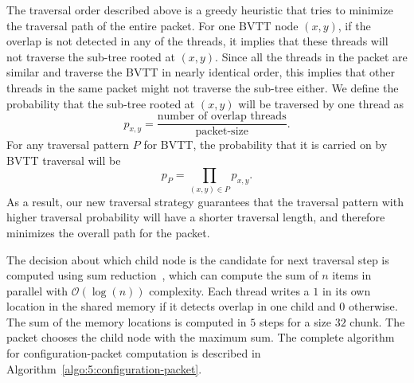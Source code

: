 The traversal order described above is a greedy heuristic that tries to minimize the traversal path of the entire packet. For one BVTT node $(x,y)$, if the overlap is not detected in any of the threads, it implies that these threads will not traverse the
sub-tree rooted at $(x,y)$. Since all the threads in the packet are similar and traverse the BVTT in nearly identical order,
this implies that other threads in the same packet might not traverse the sub-tree either. We define the probability that the sub-tree rooted at $(x,y)$ will be traversed by one thread as $$p_{x,y} = \frac{\text{number of overlap\ threads}}{\text{packet-size}}.$$ For any traversal pattern $P$ for BVTT, the probability that it is carried on by BVTT traversal will be $$p_P = \prod_{(x,y)\in P} p_{x,y}.$$
As a result, our new traversal strategy guarantees
that the traversal pattern with higher traversal probability will have a shorter traversal length, and therefore minimizes the overall
path for the packet.

The decision about which child node is the candidate for next traversal step is computed using sum reduction~\cite{Mark:2009:sdk},
which can compute the sum of $n$ items in parallel with  $\mathcal{O}(\log(n))$ complexity. Each thread writes a $1$ in its own location in
the shared memory if it detects overlap in one child and $0$ otherwise. The sum of the memory locations is computed in
$5$ steps for  a size $32$ chunk. The packet chooses the child node with the maximum sum. The complete algorithm for configuration-packet computation is described in Algorithm~\ref{algo:5:configuration-packet}.

